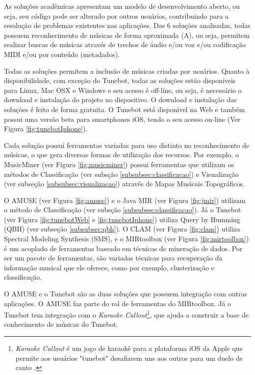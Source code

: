 As soluções acadêmicas apresentam um modelo de desenvolvimento aberto, ou seja, seu código pode ser alterado por outros usuários, contribuindo para a resolução de problemas existentes nas aplicações. Das 6 soluções analisadas, todas possuem reconhecimento de músicas de forma aproximada (A), ou seja, permitem realizar buscas de músicas através de trechos de áudio e/ou voz e/ou codificação MIDI e/ou por conteúdo (metadados).

Todas as soluções permitem a inclusão de músicas criadas por usuários. Quanto à disponibilidade, com exceção do Tunebot, todas as soluções estão disponíveis para Linux, Mac OSX e Windows e seu acesso é off-line, ou seja, é necessário o download e instalação do projeto no dispositivo. O download e instalação das soluções é feito de forma gratuita. O Tunebot está disponivel na Web e também possui uma versão beta para smartphones iOS, tendo o seu acesso on-line (Ver Figura \ref{fig:tunebotIphone}).

Cada solução possui ferramentas variadas para uso distinto no reconhecimento de músicas, o que gera diversas formas de utilização dos recursos. Por exemplo, o MusicMiner (ver Figura \ref{fig:musicminer}) possui ferramentas que utilizam os métodos de Classificação (ver subsção \ref{subsubsec:classificacao}) e Visualização (ver subseção \ref{subsubsec:visualizacao}) através de Mapas Musicais Topográficos.

O AMUSE (ver Figura \ref{fig:amuse}) e o Java MIR (ver Figura \ref{fig:jmir}) utilizam o método de Classificação (ver subsção \ref{subsubsec:classificacao}). Já o Tunebot (ver Figura \ref{fig:tunebotWeb} e \ref{fig:tunebotIphone}) utiliza Query by Humming (QBH) (ver subseção \ref{subsubsec:qbh}). O CLAM (ver Figura \ref{fig:clam}) utiliza Spectral Modeling Synthesis (SMS), e o MIRtoolbox (ver Figura \ref{fig:mirtoolbox}) é um acoplado de ferramentas baseado em técnicas de mineração de dados. Por ser um pacote de ferramentas, são variadas técnicas para recuperação da informação musical que ele oferece, como por exemplo, clusterização e classificação.

O AMUSE e o Tunebot são as duas soluções que possuem integração com outras aplicações. O AMUSE faz parte do rol de ferramentas do MIRtoolbox. Já o Tunebot tem integração com o \textit{Karaoke Callout}\footnote{\textit{Karaoke Callout} é um jogo de karaokê para a plataforma iOS da Apple que permite aos usuários "tunebot" desafiarem uns aos outros para um duelo de canto \cite{karaokeCallout2006}.}, que ajuda a construir a base de conhecimento de músicas do Tunebot.

